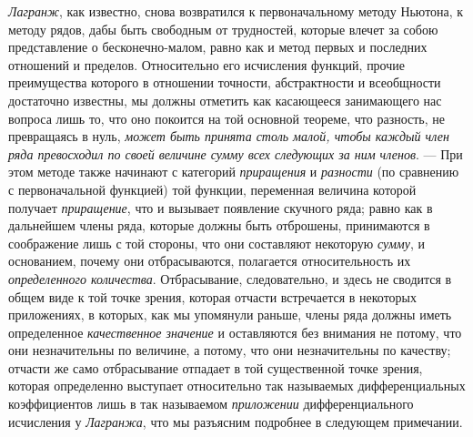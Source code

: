 {\em Лагранж}, как известно, снова возвратился к
первоначальному методу Ньютона, к методу рядов, дабы быть свободным от
трудностей, которые влечет за собою представление о бесконечно-малом, равно
как и метод первых и последних отношений и пределов. Относительно его
исчисления функций, прочие преимущества которого в отношении точности,
абстрактности и всеобщности достаточно известны, мы должны отметить как
касающееся занимающего нас вопроса лишь то, что оно покоится на той
основной теореме, что разность, не превращаясь в нуль,
{\em может быть принята столь малой, чтобы каждый член
ряда превосходил по своей величине сумму всех следующих за ним членов}. —
При этом методе также начинают с категорий
{\em приращения} и {\em разности}
(по сравнению с первоначальной функцией) той функции, переменная величина
которой получает {\em приращение}, что и вызывает
появление скучного ряда; равно как в дальнейшем члены ряда, которые должны
быть отброшены, принимаются в соображение лишь с той стороны, что они
составляют некоторую {\em сумму}, и основанием, почему
они отбрасываются, полагается относительность их
{\em определенного количества}. Отбрасывание,
следовательно, и здесь не сводится в общем виде к той точке зрения, которая
отчасти встречается в некоторых приложениях, в которых, как мы упомянули
раньше, члены ряда должны иметь определенное
{\em качественное значение} и оставляются без внимания
не потому, что они незначительны по величине, а потому, что они
незначительны по качеству; отчасти же само отбрасывание отпадает в той
существенной точке зрения, которая определенно выступает относительно так
называемых дифференциальных коэффициентов лишь в так называемом
{\em приложении} дифференциального исчисления у
{\em Лагранжа}, что мы разъясним подробнее в следующем
примечании.

